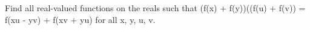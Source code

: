 
\item Find all real-valued functions on the reals such that (f(x) + f(y))((f(u) + f(v)) = f(xu - yv) + f(xv + yu) for all x, y, u, v.

